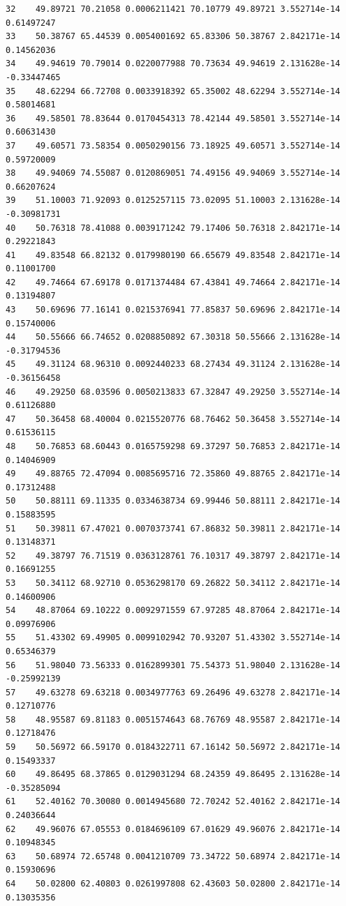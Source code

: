 \documentclass[]{article}
\begin{document}
\begin{verbatim}
32    49.89721 70.21058 0.0006211421 70.10779 49.89721 3.552714e-14  0.61497247
33    50.38767 65.44539 0.0054001692 65.83306 50.38767 2.842171e-14  0.14562036
34    49.94619 70.79014 0.0220077988 70.73634 49.94619 2.131628e-14 -0.33447465
35    48.62294 66.72708 0.0033918392 65.35002 48.62294 3.552714e-14  0.58014681
36    49.58501 78.83644 0.0170454313 78.42144 49.58501 3.552714e-14  0.60631430
37    49.60571 73.58354 0.0050290156 73.18925 49.60571 3.552714e-14  0.59720009
38    49.94069 74.55087 0.0120869051 74.49156 49.94069 3.552714e-14  0.66207624
39    51.10003 71.92093 0.0125257115 73.02095 51.10003 2.131628e-14 -0.30981731
40    50.76318 78.41088 0.0039171242 79.17406 50.76318 2.842171e-14  0.29221843
41    49.83548 66.82132 0.0179980190 66.65679 49.83548 2.842171e-14  0.11001700
42    49.74664 67.69178 0.0171374484 67.43841 49.74664 2.842171e-14  0.13194807
43    50.69696 77.16141 0.0215376941 77.85837 50.69696 2.842171e-14  0.15740006
44    50.55666 66.74652 0.0208850892 67.30318 50.55666 2.131628e-14 -0.31794536
45    49.31124 68.96310 0.0092440233 68.27434 49.31124 2.131628e-14 -0.36156458
46    49.29250 68.03596 0.0050213833 67.32847 49.29250 3.552714e-14  0.61126880
47    50.36458 68.40004 0.0215520776 68.76462 50.36458 3.552714e-14  0.61536115
48    50.76853 68.60443 0.0165759298 69.37297 50.76853 2.842171e-14  0.14046909
49    49.88765 72.47094 0.0085695716 72.35860 49.88765 2.842171e-14  0.17312488
50    50.88111 69.11335 0.0334638734 69.99446 50.88111 2.842171e-14  0.15883595
51    50.39811 67.47021 0.0070373741 67.86832 50.39811 2.842171e-14  0.13148371
52    49.38797 76.71519 0.0363128761 76.10317 49.38797 2.842171e-14  0.16691255
53    50.34112 68.92710 0.0536298170 69.26822 50.34112 2.842171e-14  0.14600906
54    48.87064 69.10222 0.0092971559 67.97285 48.87064 2.842171e-14  0.09976906
55    51.43302 69.49905 0.0099102942 70.93207 51.43302 3.552714e-14  0.65346379
56    51.98040 73.56333 0.0162899301 75.54373 51.98040 2.131628e-14 -0.25992139
57    49.63278 69.63218 0.0034977763 69.26496 49.63278 2.842171e-14  0.12710776
58    48.95587 69.81183 0.0051574643 68.76769 48.95587 2.842171e-14  0.12718476
59    50.56972 66.59170 0.0184322711 67.16142 50.56972 2.842171e-14  0.15493337
60    49.86495 68.37865 0.0129031294 68.24359 49.86495 2.131628e-14 -0.35285094
61    52.40162 70.30080 0.0014945680 72.70242 52.40162 2.842171e-14  0.24036644
62    49.96076 67.05553 0.0184696109 67.01629 49.96076 2.842171e-14  0.10948345
63    50.68974 72.65748 0.0041210709 73.34722 50.68974 2.842171e-14  0.15930696
64    50.02800 62.40803 0.0261997808 62.43603 50.02800 2.842171e-14  0.13035356

\end{verbatim}
\end{document}
